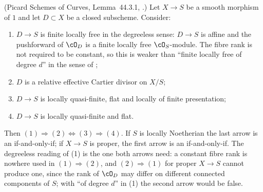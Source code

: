 \begin{lemma}
\label{lem:pc-cartier-criterion}
(Picard Schemes of Curves, Lemma~44.3.1,
.)  Let
$X\to S$ be a smooth morphism of
 $1$ and let
$D\subset X$ be a closed subscheme.  Consider:
\begin{enumerate}
\item[(1)] $D\to S$ is finite locally free in the degreeless sense:
$D\to S$ is affine and the pushforward of $\cO_D$ is a finite locally
free $\cO_S$-module.  The fibre rank is not required to be constant, so
this is weaker than ``finite locally free of degree $d$'' in the sense
of ;
\item[(2)] $D$ is a relative effective Cartier divisor on $X/S$;
\item[(3)] $D\to S$ is locally quasi-finite, flat and locally of finite
presentation;
\item[(4)] $D\to S$ is locally quasi-finite and flat.
\end{enumerate}
Then $(1)\Rightarrow(2)\Leftrightarrow(3)\Rightarrow(4)$.  If $S$ is
locally Noetherian the last arrow is an if-and-only-if; if $X\to S$ is
proper, the first arrow is an if-and-only-if.  The degreeless reading of
(1) is the one both arrows need: a constant fibre rank is nowhere used
in $(1)\Rightarrow(2)$, and $(2)\Rightarrow(1)$ for proper $X\to S$
cannot produce one, since the rank of $\cO_D$ may differ on different
connected components of $S$; with ``of degree $d$'' in (1) the second
arrow would be false.
\end{lemma}
